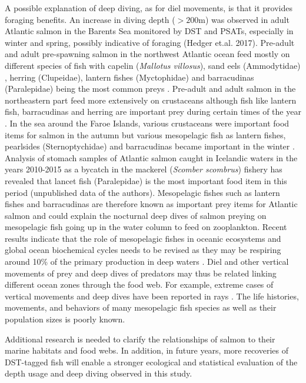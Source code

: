 A possible explanation of deep diving, as for diel movements, is that it provides foraging benefits.
An increase in diving depth ($> 200$m) was observed in adult Atlantic salmon in the Barents Sea monitored by DST and PSATs, especially in winter and spring, possibly indicative of foraging (Hedger et.al. 2017). 
Pre-adult and adult pre-spawning salmon in the northwest Atlantic ocean feed mostly on different species of fish with capelin (\textit{Mallotus villosus}), sand eels (Ammodytidae) , herring (Clupeidae), lantern fishes (Myctophidae) and barracudinas (Paralepidae) being the most common preys \citep{Rikardsen2011}. 
Pre-adult and adult salmon in the northeastern part feed more extensively on crustaceans although fish like lantern fish, barracudinas and herring are important prey during certain times of the year \citep{Rikardsen2011}. 
In the sea around the Faroe Islands, various crustaceans were important food items for salmon in the autumn but various mesopelagic fish as lantern fishes, pearlsides (Sternoptychidae) and barracudinas became important in the winter \citep{Jacobsen2001}. 
Analysis of stomach samples of Atlantic salmon caught in Icelandic waters in the years 2010-2015 as a bycatch in the mackerel (\textit{Scomber scombrus}) fishery has revealed that lancet fish (Paralepidae) is the most important food item in this period (unpublished data of the authors). 
Mesopelagic fishes such as lantern fishes and barracudinas are therefore known as important prey items for Atlantic salmon and could explain the nocturnal deep dives of salmon preying on mesopelagic fish going up in the water column to feed on zooplankton. 
Recent results indicate that the role of mesopelagic fishes in oceanic ecosystems and global ocean biochemical cycles needs to be revised as they may be respiring around 10\% of the primary production in deep waters \citep{Irigoien2014}. 
Diel and other vertical movements of prey and deep dives of predators may thus be related linking different ocean zones through the food web. 
For example, extreme cases of vertical movements and deep dives have been reported in rays \citep{Thorrold2014}. 
The life histories, movements, and behaviors of many mesopelagic fish species as well as their population sizes is poorly known. 

Additional research is needed to clarify the relationships of salmon to their marine habitats and food webs. In addition, in future years, more recoveries of DST-tagged fish will enable a stronger ecological and statistical evaluation of the depth usage and deep diving observed in this study. 

